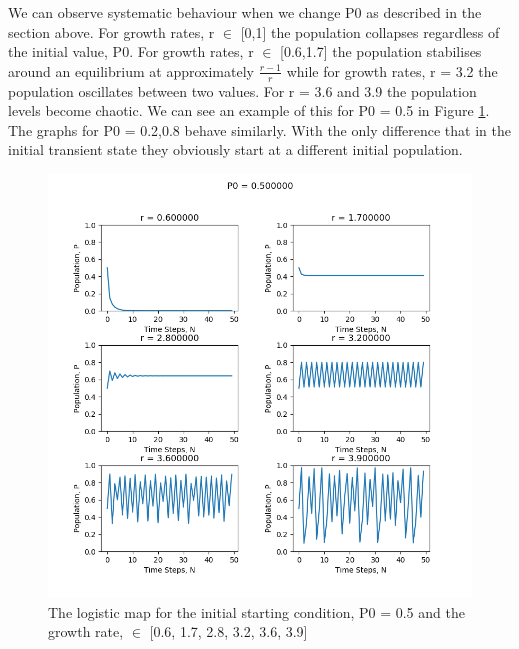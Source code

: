\documentclass[11pt,a4paper]{CLabBookTemplate} %
\begin{document}
We can observe systematic behaviour when we change P0 as described in the section above. For growth rates, r $\in$ [0,1] the population collapses regardless of the initial value, P0. For growth rates, r $\in$ [0.6,1.7] the population stabilises around an equilibrium at approximately $\frac{r -1 }{r}$ while for growth rates, r = 3.2 the population oscillates between two values. For r = 3.6 and 3.9 the population levels become chaotic. We can see an example of this for P0 = 0.5 in Figure \ref{fig:LogisticMapP05}. The graphs for P0 = 0.2,0.8 behave similarly. With the only difference that in the initial transient state they obviously start at a different initial population. 
\begin{figure}[h!]
	\centering
	\includegraphics[width = 160mm]{Figures/DLMP0.png}
	\caption{The logistic map for the initial starting condition, P0 = 0.5 and the growth rate, $\in$  [0.6, 1.7, 2.8, 3.2, 3.6, 3.9] }
	\label{fig:LogisticMapP05}
\end{figure}
\end{document}
